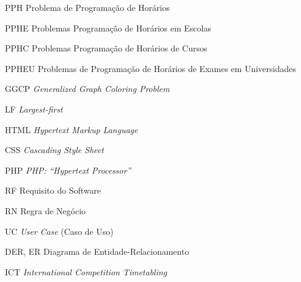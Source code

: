 \begin{siglas}
  \item[PPH] Problema de Programação de Horários
  \item[PPHE] Problemas Programação de Horários em Escolas 
  \item[PPHC] Problemas Programação de Horários de Cursos 
  \item[PPHEU] Problemas de Programação de Horários de Exames em Universidades
  \item[GGCP] \textit{Generalized Graph Coloring Problem}
  \item[LF] \textit{Largest-first}
  \item[HTML] \textit{Hypertext Markup Language}
  \item[CSS] \textit{Cascading Style Sheet}
  \item[PHP] \textit{PHP: “Hypertext Processor”}
  \item[RF] Requisito do Software
  \item[RN]  Regra de Negócio
  \item[UC] \textit{User Case} (Caso de Uso)
  \item[DER, ER] Diagrama de Entidade-Relacionamento
  \item[ICT] \textit{International Competition Timetabling}
\end{siglas}

